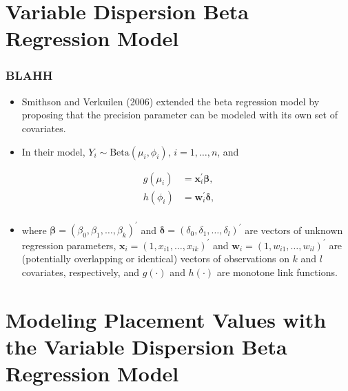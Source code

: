 \documentclass[t]{beamer}
\newcommand{\matr}[1]{\mathbf{#1}}
\begin{document}
\section{Variable Dispersion Beta Regression Model}

\begin{frame}
	\frametitle{BLAHH}
	\begin{itemize}
		\item Smithson and Verkuilen (2006) extended the beta regression model by proposing that the precision parameter can be modeled with its own set of covariates. 
		\item In their model, $Y_i \sim \text{Beta}(\mu_i, \phi_i), \, i = 1, \dots, n$, and 
	\end{itemize}
\vspace{-.1in}
\begin{align*}
g(\mu_i) &= \matr{x}_i^{\prime}\bm{\beta}, \\
h(\phi_i) &= \matr{w}_i^{\prime}\bm{\delta}, \\
\end{align*}
\vspace{-.4in}
\begin{itemize}
	\item[] where $\bm{\beta} = (\beta_0, \beta_1, \dots, \beta_k)^{\prime}$ and $\bm{\delta} = (\delta_0, \delta_1, \dots, \delta_l)^{\prime}$ are vectors of unknown regression parameters, $\matr{x}_i = (1, x_{i1}, \dots, x_{ik})^{\prime}$ and $\matr{w}_i = (1, w_{i1}, \dots, w_{il})^{\prime}$ are (potentially overlapping or identical) vectors of observations on $k$ and $l$ covariates, respectively, and $g(\cdot)$ and $h(\cdot)$ are monotone link functions. 
\end{itemize}
\end{frame}

\section{Modeling Placement Values with the Variable Dispersion Beta Regression Model}
\end{document}
